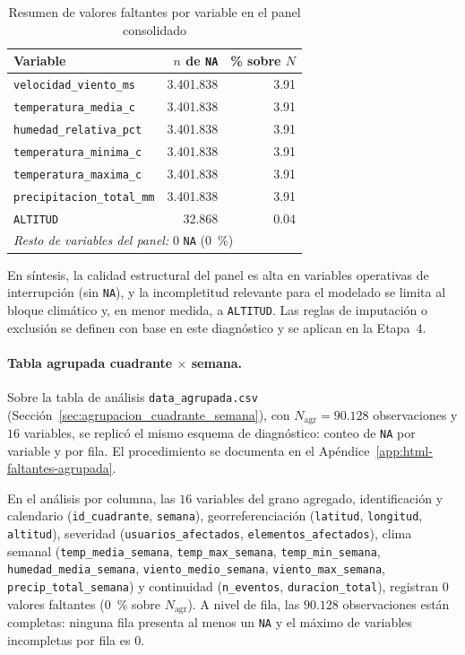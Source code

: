     \begin{table}[!htbp]
    \centering
\small
    \caption{Resumen de valores faltantes por variable en el panel consolidado}
    \label{tab:resumen_datos_faltantes}
    \begin{tabular}{l r r}
\toprule
    \textbf{Variable} & \textbf{$n$ de \texttt{NA}} & \textbf{\% sobre $N$} \\
\midrule
    \texttt{velocidad\_viento\_ms} & 3{.}401{.}838 & 3.91 \\
    \texttt{temperatura\_media\_c} & 3{.}401{.}838 & 3.91 \\
    \texttt{humedad\_relativa\_pct} & 3{.}401{.}838 & 3.91 \\
    \texttt{temperatura\_minima\_c} & 3{.}401{.}838 & 3.91 \\
    \texttt{temperatura\_maxima\_c} & 3{.}401{.}838 & 3.91 \\
    \texttt{precipitacion\_total\_mm} & 3{.}401{.}838 & 3.91 \\
    \texttt{ALTITUD} & 32{.}868 & 0.04 \\
    \midrule
    \multicolumn{3}{l}{\textit{Resto de variables del panel:} $0$ \texttt{NA} ($0$~\%)} \\
    \bottomrule
    \end{tabular}
    \end{table}
    
    \noindent En síntesis, la calidad estructural del panel es alta en variables operativas de interrupción (sin \texttt{NA}), y la incompletitud relevante para el modelado se limita al bloque climático y, en menor medida, a \texttt{ALTITUD}. Las reglas de imputación o exclusión se definen con base en este diagnóstico y se aplican en la Etapa~4.
    
    \paragraph{Tabla agrupada cuadrante $\times$ semana.} Sobre la tabla de análisis \texttt{data\_agrupada.csv} (Sección~\ref{sec:agrupacion_cuadrante_semana}), con $N_{\mathrm{agr}} = 90{.}128$ observaciones y $16$ variables, se replicó el mismo esquema de diagnóstico: conteo de \texttt{NA} por variable y por fila. El procedimiento se documenta en el Apéndice~\ref{app:html-faltantes-agrupada}.
    
    En el análisis por columna, las $16$ variables del grano agregado, identificación y calendario (\texttt{id\_cuadrante}, \texttt{semana}), georreferenciación (\texttt{latitud}, \texttt{longitud}, \texttt{altitud}), severidad (\texttt{usuarios\_afectados}, \texttt{elementos\_afectados}), clima semanal (\texttt{temp\_media\_semana}, \texttt{temp\_max\_semana}, \texttt{temp\_min\_semana}, \texttt{humedad\_media\_semana}, \texttt{viento\_medio\_semana}, \texttt{viento\_max\_semana}, \texttt{precip\_total\_semana}) y continuidad (\texttt{n\_eventos}, \texttt{duracion\_total}), registran $0$ valores faltantes ($0$~\% sobre $N_{\mathrm{agr}}$). A nivel de fila, las $90{.}128$ observaciones están completas: ninguna fila presenta al menos un \texttt{NA} y el máximo de variables incompletas por fila es $0$.
    
